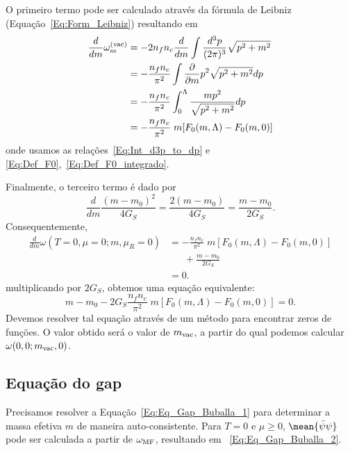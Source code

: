 O primeiro termo pode ser calculado através da fórmula de Leibniz (Equação~\eqref{Eq:Form_Leibniz}) resultando em
\begin{align}
	\frac{d}{dm}\omega_m^{\rm{(vac)}} &= -2 n_f n_c\frac{d}{dm}\int \frac{d^3p}{(2\pi)^3} \sqrt{p^2 + m^2} \\
	&= - \frac{n_f n_c}{\pi^2} \int \frac{\partial}{\partial m} p^2\sqrt{p^2+m^2} dp \\
	&= - \frac{n_f n_c}{\pi^2} \int_0^\Lambda \frac{mp^2}{\sqrt{p^2+m^2}} dp \\
	&= - \frac{n_f n_c}{\pi^2} \;m [F_0(m, \Lambda) - F_0(m,0)]
\end{align}
%
onde usamos as relações~\eqref{Eq:Int_d3p_to_dp} e \eqref{Eq:Def_F0},~\eqref{Eq:Def_F0_integrado}.

Finalmente, o terceiro termo é dado por
\begin{equation}
	\frac{d}{dm} \frac{(m - m_0)^2}{4G_S} = \frac{2 (m - m_0)}{4G_S} = \frac{m - m_0}{2G_S}.
\end{equation}
%
Consequentemente,
\begin{align}
	\frac{d}{dm} \omega(T = 0, \mu = 0; m, \mu_R = 0) &= - \frac{n_f n_c}{\pi^2} \;m [F_0(m, \Lambda) - F_0(m,0)] \\
	&\phantom{=}~+ \frac{m - m_0}{2G_S} \nonumber \\
	&= 0.
\end{align}
%
multiplicando por $2G_S$, obtemos uma equação equivalente:
\begin{equation}\label{Eq:Calculo_m_vac}
	m - m_0 - 2G_S\frac{n_f n_c}{\pi^2} \;m [F_0(m, \Lambda) - F_0(m,0)] = 0.
\end{equation}
%
Devemos resolver tal equação através de um método para encontrar zeros de funções. O valor obtido será o valor de $m_{\rm{vac}}$, a partir do qual podemos calcular $\omega(0,0;m_{\rm{vac}}, 0)$.

\subsection{Equação do gap}

Precisamos resolver a Equação~\eqref{Eq:Eq_Gap_Buballa_1} para determinar a massa efetiva $m$ de maneira auto-consistente. Para $T=0$ e $\mu \geqslant 0$, $\mean{\bar\psi\psi}$ pode ser calculada a partir de $\omega_{\rm{MF}}$, resultando em ~\eqref{Eq:Eq_Gap_Buballa_2}.

